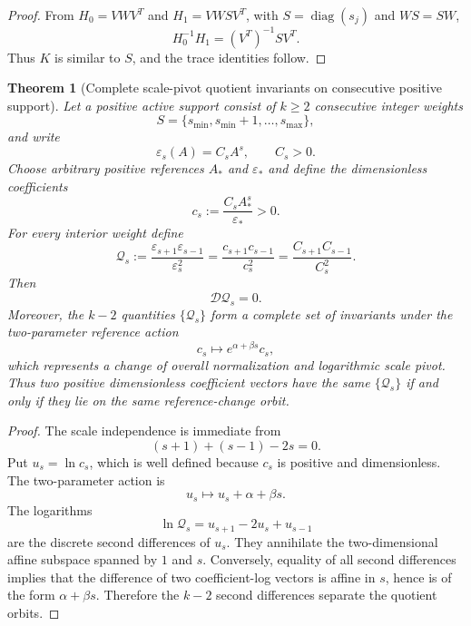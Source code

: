 \documentclass[aps,prd,preprint,onecolumn,nofootinbib,superscriptaddress,showkeys]{revtex4-2}
\numberwithin{equation}{section}
\theoremstyle{definition}
\theoremstyle{plain}
\newtheorem{theorem}{Theorem}[section]
\newcommand{\Dil}{\mathscr D}
\newcommand{\diag}{\operatorname{diag}}
\begin{document}
\begin{proof}
From $H_0=VWV^T$ and $H_1=VWSV^T$, with $S=\diag(s_j)$ and $WS=SW$,
\[
H_0^{-1}H_1=(V^T)^{-1}SV^T.
\]
Thus $K$ is similar to $S$, and the trace identities follow.
\end{proof}

\begin{theorem}[Complete scale-pivot quotient invariants on consecutive positive support]\label{thm:crossratio}
Let a positive active support consist of $k\ge2$ consecutive integer weights
\[
S=\{s_{\min},s_{\min}+1,\ldots,s_{\max}\},
\]
and write
\[
\varepsilon_s(A)=C_sA^s,\qquad C_s>0.
\]
Choose arbitrary positive references $A_*$ and $\varepsilon_*$ and define the dimensionless coefficients
\begin{equation}
 c_s:=\frac{C_sA_*^s}{\varepsilon_*}>0.
\end{equation}
For every interior weight define
\begin{equation}
\boxed{
\mathcal Q_s
:=
\frac{\varepsilon_{s+1}\varepsilon_{s-1}}{\varepsilon_s^2}
=
\frac{c_{s+1}c_{s-1}}{c_s^2}
=
\frac{C_{s+1}C_{s-1}}{C_s^2}.
}
\end{equation}
Then
\begin{equation}
\Dil\mathcal Q_s=0.
\end{equation}
Moreover, the $k-2$ quantities $\{\mathcal Q_s\}$ form a complete set of invariants under the two-parameter reference action
\begin{equation}
 c_s\longmapsto e^{\alpha+\beta s}c_s,
\end{equation}
which represents a change of overall normalization and logarithmic scale pivot.  Thus two positive dimensionless coefficient vectors have the same $\{\mathcal Q_s\}$ if and only if they lie on the same reference-change orbit.
\end{theorem}

\begin{proof}
The scale independence is immediate from
\[
(s+1)+(s-1)-2s=0.
\]
Put $u_s=\ln c_s$, which is well defined because $c_s$ is positive and dimensionless.  The two-parameter action is
\[
u_s\longmapsto u_s+\alpha+\beta s.
\]
The logarithms
\[
\ln\mathcal Q_s=u_{s+1}-2u_s+u_{s-1}
\]
are the discrete second differences of $u_s$.  They annihilate the two-dimensional affine subspace spanned by $1$ and $s$.  Conversely, equality of all second differences implies that the difference of two coefficient-log vectors is affine in $s$, hence is of the form $\alpha+\beta s$.  Therefore the $k-2$ second differences separate the quotient orbits.
\end{proof}
\end{document}
